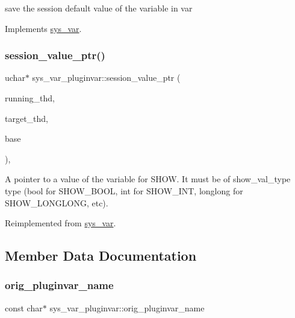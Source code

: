 save the session default value of the variable in var 

Implements \mbox{\hyperlink{classsys__var}{sys\+\_\+var}}.

\mbox{\label{classsys__var__pluginvar_a0a0dba9347c308d1dc9f2b177e29e1ef}} 
\subsubsection{\texorpdfstring{session\+\_\+value\+\_\+ptr()}{session\_value\_ptr()}}
{\footnotesize\ttfamily uchar$\ast$ sys\+\_\+var\+\_\+pluginvar\+::session\+\_\+value\+\_\+ptr (\begin{DoxyParamCaption}\item[{T\+HD $\ast$}]{running\+\_\+thd,  }\item[{T\+HD $\ast$}]{target\+\_\+thd,  }\item[{L\+E\+X\+\_\+\+S\+T\+R\+I\+NG $\ast$}]{base }\end{DoxyParamCaption})\hspace{0.3cm}{\ttfamily [inline]}, {\ttfamily [virtual]}}

A pointer to a value of the variable for S\+H\+OW. It must be of show\+\_\+val\+\_\+type type (bool for S\+H\+O\+W\+\_\+\+B\+O\+OL, int for S\+H\+O\+W\+\_\+\+I\+NT, longlong for S\+H\+O\+W\+\_\+\+L\+O\+N\+G\+L\+O\+NG, etc). 

Reimplemented from \mbox{\hyperlink{classsys__var_a3e511591aaf555d2bc2ce40a80b7e899}{sys\+\_\+var}}.



\subsection{Member Data Documentation}
\mbox{\label{classsys__var__pluginvar_ab89f1595bd3b5dadd5ea766e622469d2}} 
\subsubsection{\texorpdfstring{orig\+\_\+pluginvar\+\_\+name}{orig\_pluginvar\_name}}
{\footnotesize\ttfamily const char$\ast$ sys\+\_\+var\+\_\+pluginvar\+::orig\+\_\+pluginvar\+\_\+name}

